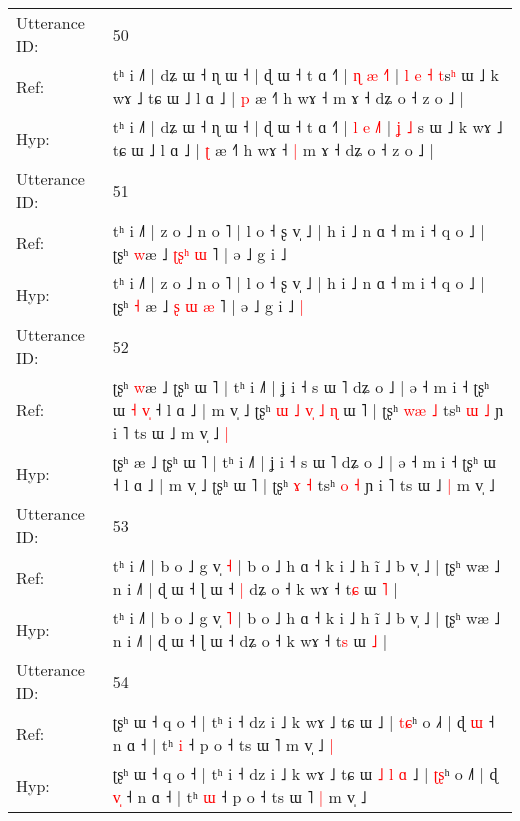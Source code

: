 \documentclass[10pt]{article}
\DeclareRobustCommand{\hl}[1]{{\textcolor{red}{#1}}}
\begin{document}
\begin{longtable}{ll}
 \\
\midrule
Utterance ID: & 50 \\
Ref: & tʰ i ˩˥ | dʑ ɯ ˧ ɳ ɯ ˧ | ɖ ɯ ˧ t ɑ ˧˥ | \hl{ɳ} \hl{æ} \hl{˧}˥ |\hl{ }\hl{l} \hl{e} \hl{˧} \hl{t}s\hl{ʰ} ɯ ˩ k wɤ ˩ tɕ ɯ ˩ l ɑ ˩ | \hl{p} æ ˧˥ h wɤ ˧\hl{}\hl{} m ɤ ˧ dʑ o ˧ z o ˩ |
 \\
Hyp: & tʰ i ˩˥ | dʑ ɯ ˧ ɳ ɯ ˧ | ɖ ɯ ˧ t ɑ ˧˥ | \hl{l} \hl{e} \hl{˩}˥ |\hl{}\hl{} \hl{ʝ} \hl{˩} \hl{}s\hl{} ɯ ˩ k wɤ ˩ tɕ ɯ ˩ l ɑ ˩ | \hl{ʈ} æ ˧˥ h wɤ ˧\hl{ }\hl{|} m ɤ ˧ dʑ o ˧ z o ˩ |
 \\
\midrule
Utterance ID: & 51 \\
Ref: & tʰ i ˩˥ | z o ˩ n o ˥ | l o ˧ ʂ v̩ ˩ | h i ˩ n ɑ ˧ m i ˧ q o ˩ | ʈʂʰ \hl{}\hl{w}æ ˩ \hl{ʈ}\hl{ʂ}\hl{ʰ} \hl{ɯ} ˥ | ə ˩ g i ˩\hl{}\hl{}
 \\
Hyp: & tʰ i ˩˥ | z o ˩ n o ˥ | l o ˧ ʂ v̩ ˩ | h i ˩ n ɑ ˧ m i ˧ q o ˩ | ʈʂʰ \hl{˧}\hl{ }æ ˩ \hl{ʂ}\hl{ }\hl{ɯ} \hl{æ} ˥ | ə ˩ g i ˩\hl{ }\hl{|}
 \\
\midrule
Utterance ID: & 52 \\
Ref: & ʈʂʰ \hl{w}æ ˩ ʈʂʰ ɯ ˥ | tʰ i ˩˥ | ʝ i ˧ s ɯ ˥ dʑ o ˩ | ə ˧ m i ˧ ʈʂʰ ɯ\hl{ }\hl{˧}\hl{ }\hl{v}\hl{̩} ˧ l ɑ ˩ | m v̩ ˩ ʈʂʰ\hl{ }\hl{ɯ}\hl{ }\hl{˩}\hl{ }\hl{v}\hl{̩}\hl{ }\hl{˩}\hl{ }\hl{ɳ} ɯ ˥ | ʈʂʰ \hl{w}\hl{æ} \hl{˩} tsʰ \hl{ɯ} \hl{˩} ɲ i ˥ ts ɯ ˩\hl{}\hl{} m v̩ ˩\hl{ }\hl{|}
 \\
Hyp: & ʈʂʰ \hl{}æ ˩ ʈʂʰ ɯ ˥ | tʰ i ˩˥ | ʝ i ˧ s ɯ ˥ dʑ o ˩ | ə ˧ m i ˧ ʈʂʰ ɯ\hl{}\hl{}\hl{}\hl{}\hl{} ˧ l ɑ ˩ | m v̩ ˩ ʈʂʰ\hl{}\hl{}\hl{}\hl{}\hl{}\hl{}\hl{}\hl{}\hl{}\hl{}\hl{} ɯ ˥ | ʈʂʰ \hl{}\hl{ɤ} \hl{˧} tsʰ \hl{o} \hl{˧} ɲ i ˥ ts ɯ ˩\hl{ }\hl{|} m v̩ ˩\hl{}\hl{}
 \\
\midrule
Utterance ID: & 53 \\
Ref: & tʰ i ˩˥ | b o ˩ g v̩ \hl{˧} | b o ˩ h ɑ ˧ k i ˩ h ĩ ˩ b v̩ ˩ | ʈʂʰ wæ ˩ n i ˩˥ | ɖ ɯ ˧ ɭ ɯ ˧\hl{ }\hl{|} dʑ o ˧ k wɤ ˧ t\hl{ɕ} ɯ \hl{˥} |
 \\
Hyp: & tʰ i ˩˥ | b o ˩ g v̩ \hl{˥} | b o ˩ h ɑ ˧ k i ˩ h ĩ ˩ b v̩ ˩ | ʈʂʰ wæ ˩ n i ˩˥ | ɖ ɯ ˧ ɭ ɯ ˧\hl{}\hl{} dʑ o ˧ k wɤ ˧ t\hl{s} ɯ \hl{˩} |
 \\
\midrule
Utterance ID: & 54 \\
Ref: & ʈʂʰ ɯ ˧ q o ˧ | tʰ i ˧ dz i ˩ k wɤ ˩ tɕ ɯ\hl{}\hl{}\hl{}\hl{}\hl{}\hl{} ˩ | \hl{t}\hl{ɕ}ʰ o ˩\hl{˧} | ɖ \hl{}\hl{ɯ} ˧ n ɑ ˧ | tʰ \hl{i} ˧ p o ˧ ts ɯ ˥\hl{}\hl{} m v̩ ˩\hl{ }\hl{|}
 \\
Hyp: & ʈʂʰ ɯ ˧ q o ˧ | tʰ i ˧ dz i ˩ k wɤ ˩ tɕ ɯ\hl{ }\hl{˩}\hl{ }\hl{l}\hl{ }\hl{ɑ} ˩ | \hl{ʈ}\hl{ʂ}ʰ o ˩\hl{˥} | ɖ \hl{v}\hl{̩} ˧ n ɑ ˧ | tʰ \hl{ɯ} ˧ p o ˧ ts ɯ ˥\hl{ }\hl{|} m v̩ ˩\hl{}\hl{}

\end{longtable}
\end{document}
